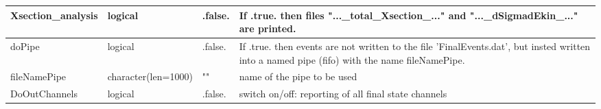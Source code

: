 \documentclass{article}
\begin{document}
\begin{longtable}{llll}
\midrule
Xsection\_analysis & \begin{minipage}[t]{2cm}logical\end{minipage} & \begin{minipage}[t]{2cm}.false.\end{minipage} & \begin{minipage}[t]{12cm}If .true. then files "...\_total\_Xsection\_..."  and "...\_dSigmadEkin\_..." are printed.\end{minipage}\\*
\midrule
doPipe & \begin{minipage}[t]{2cm}logical\end{minipage} & \begin{minipage}[t]{2cm}.false.\end{minipage} & \begin{minipage}[t]{12cm}If .true. then events are not written to the file 'FinalEvents.dat', but insted written into a named pipe (fifo) with the name fileNamePipe.\end{minipage}\\*
\midrule
fileNamePipe & \begin{minipage}[t]{2cm}character(len=1000)\end{minipage} & \begin{minipage}[t]{2cm}""\end{minipage} & \begin{minipage}[t]{12cm}name of the pipe to be used\end{minipage}\\*
\midrule
DoOutChannels & \begin{minipage}[t]{2cm}logical\end{minipage} & \begin{minipage}[t]{2cm}.false.\end{minipage} & \begin{minipage}[t]{12cm}switch on/off: reporting of all final state channels\end{minipage}\\*
\bottomrule
\end{longtable}
{ }



\end{document}
